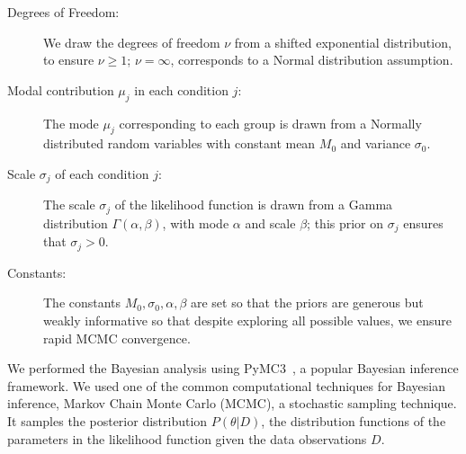 \begin{description}
    \item[Degrees of Freedom:] We draw the degrees of freedom $\nu$ from a shifted exponential distribution, to ensure $\nu \geq 1$; $\nu=\infty$, corresponds to a Normal distribution assumption.
    \item[Modal contribution $\mu_j$ in each condition $j$:] The mode $\mu_j$ corresponding to each group is drawn from a Normally distributed random variables with constant mean $M_0$ and variance $\sigma_0$. 
    \item[Scale $\sigma_j$ of each condition $j$:]  The scale $\sigma_j$ of the likelihood function is drawn from a Gamma distribution $\Gamma(\alpha, \beta)$, with mode $\alpha$ and scale $\beta$; this prior on $\sigma_j$ ensures that $\sigma_j > 0$. 
    \item[Constants:] The constants $M_0, \sigma_0, \alpha, \beta$ are set so that the priors are generous but weakly informative so that despite exploring all possible values, we ensure rapid MCMC convergence.
\end{description}

We performed the Bayesian analysis using PyMC3~\cite{salvatier2016probabilistic}, 
a popular Bayesian inference framework. We used one of the common computational techniques for Bayesian inference, Markov Chain Monte Carlo (MCMC), a stochastic sampling technique. It samples the posterior distribution $P(\theta | D)$, the distribution functions of the parameters in the likelihood function given the data observations $D$. 
